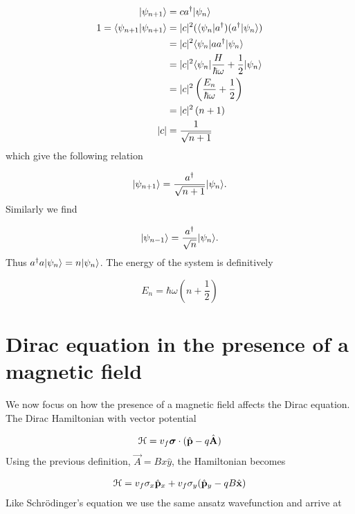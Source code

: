 \begin{align*}
  |\psi_{n+1}\rangle &= ca^{\dagger}|\psi_n\rangle \nonumber \\
  1 = \langle \psi_{n+1} | \psi_{n+1} \rangle &= |c|^2 (\langle \psi_n|a^{\dagger})(a^{\dagger}|\psi_n\rangle) \nonumber \\
  &= |c|^2 \langle \psi_n | aa^{\dagger} | \psi_n \rangle \nonumber \\
  &= |c|^2 \langle \psi_n | \dfrac{H}{\hbar\omega} + \dfrac{1}{2} |\psi_n \rangle \nonumber \\
  &= |c|^2 \left(\dfrac{E_n}{\hbar\omega} +\dfrac{1}{2} \right) \nonumber \\
  &= |c|^2 \left(n+1\right) \nonumber \\
  |c| &= \dfrac{1}{\sqrt{n+1}}
\end{align*}
which give the following relation

\begin{equation}
  |\psi_{n+1} \rangle = \dfrac{a^{\dagger}}{\sqrt{n+1}} |\psi_n \rangle.
\end{equation}
Similarly we find

\begin{equation}
  |\psi_{n-1} \rangle = \dfrac{a^{\dagger}}{\sqrt{n}} |\psi_n \rangle.
\end{equation}
Thus $a^{\dagger} a |\psi_n \rangle = n |\psi_n \rangle$.
The energy of the system is definitively

\begin{equation}
  E_n = \hbar\omega \left(n + \dfrac{1}{2} \right)
\end{equation}

\section{Dirac equation in the presence of a magnetic field}
\label{appendix:dirac}
We now focus on how the presence of a magnetic field affects the Dirac equation.
The Dirac Hamiltonian with vector potential

\begin{equation}
  \ham = v_f \bm{\sigma}\cdot(\op{p} - q\op{A})
\end{equation}
Using the previous definition, $\vec{A} = Bx\hat{y}$, the Hamiltonian becomes

\begin{align}
  \ham = v_f \sigma_x \op{p}_x + v_f \sigma_y (\op{p}_y - qB\op{x})
\end{align}
Like Schr\"{o}dinger's equation we use the same ansatz wavefunction and arrive at


